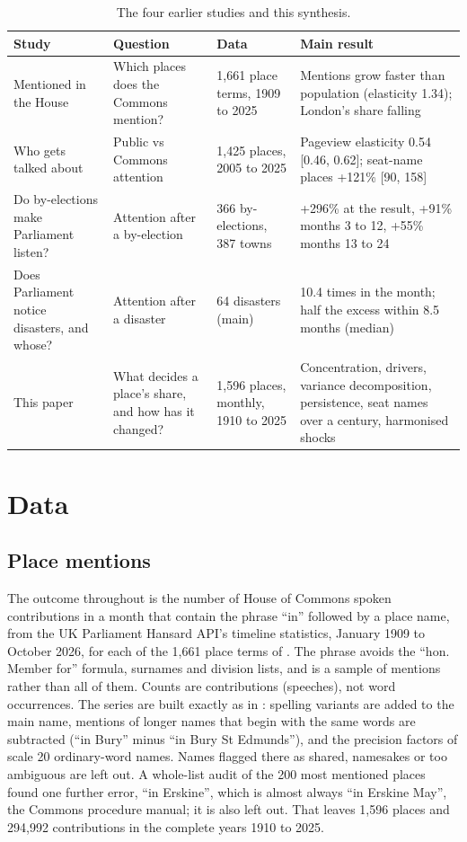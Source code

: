 \documentclass[11pt,a4paper]{article}
\begin{document}
\begin{table}[tbp]\centering\footnotesize\caption{The four earlier studies and this synthesis.}\label{tab:sources}\begin{tabular}{p{3.3cm}p{3.0cm}p{2.8cm}p{5.2cm}}\toprule Study & Question & Data & Main result\\\midrule
Mentioned in the House \citep{hotham2026a} & Which places does the Commons mention? & 1,661 place terms, 1909 to 2025 & Mentions grow faster than population (elasticity 1.34); London's share falling\\
Who gets talked about \citep{hotham2026b} & Public vs Commons attention & 1,425 places, 2005 to 2025 & Pageview elasticity 0.54 [0.46, 0.62]; seat-name places +121\% [90, 158]\\
Do by-elections make Parliament listen? \citep{hotham2026c} & Attention after a by-election & 366 by-elections, 387 towns & +296\% at the result, +91\% months 3 to 12, +55\% months 13 to 24\\
Does Parliament notice disasters, and whose? \citep{hotham2026d} & Attention after a disaster & 64 disasters (main) & 10.4 times in the month; half the excess within 8.5 months (median)\\
This paper & What decides a place's share, and how has it changed? & 1,596 places, monthly, 1910 to 2025 & Concentration, drivers, variance decomposition, persistence, seat names over a century, harmonised shocks\\
\bottomrule\end{tabular}\end{table}

\section{Data}\label{sec:data}
\subsection{Place mentions}
The outcome throughout is the number of House of Commons spoken contributions in a month that contain the phrase ``in'' followed by a place name, from the UK Parliament Hansard API's timeline statistics, January 1909 to October 2026, for each of the 1,661 place terms of \citet{hotham2026a}. The phrase avoids the ``hon. Member for'' formula, surnames and division lists, and is a sample of mentions rather than all of them. Counts are contributions (speeches), not word occurrences. The series are built exactly as in \citet{hotham2026c}: spelling variants are added to the main name, mentions of longer names that begin with the same words are subtracted (``in Bury'' minus ``in Bury St Edmunds''), and the precision factors of \citet{hotham2026a} scale 20 ordinary-word names. Names flagged there as shared, namesakes or too ambiguous are left out. A whole-list audit of the 200 most mentioned places found one further error, ``in Erskine'', which is almost always ``in Erskine May'', the Commons procedure manual; it is also left out. That leaves 1,596 places and 294,992 contributions in the complete years 1910 to 2025.
\end{document}
